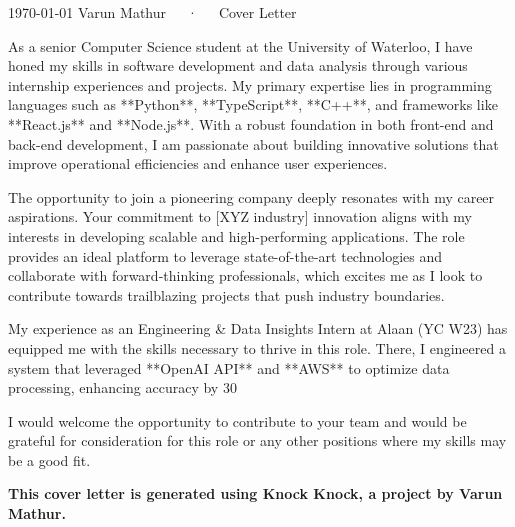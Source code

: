 \documentclass[11pt, a4paper]{awesome-cv}
\begin{document}
\makecvheader[C]

\makecvfooter
{\today}
{Varun Mathur~~~·~~~Cover Letter}
{}

\makelettertitle

\begin{cvletter}

As a senior Computer Science student at the University of Waterloo, I have honed my skills in software development and data analysis through various internship experiences and projects. My primary expertise lies in programming languages such as **Python**, **TypeScript**, **C++**, and frameworks like **React.js** and **Node.js**. With a robust foundation in both front-end and back-end development, I am passionate about building innovative solutions that improve operational efficiencies and enhance user experiences.

The opportunity to join a pioneering company deeply resonates with my career aspirations. Your commitment to [XYZ industry] innovation aligns with my interests in developing scalable and high-performing applications. The role provides an ideal platform to leverage state-of-the-art technologies and collaborate with forward-thinking professionals, which excites me as I look to contribute towards trailblazing projects that push industry boundaries.

My experience as an Engineering & Data Insights Intern at Alaan (YC W23) has equipped me with the skills necessary to thrive in this role. There, I engineered a system that leveraged **OpenAI API** and **AWS** to optimize data processing, enhancing accuracy by 30%

I would welcome the opportunity to contribute to your team and would be grateful for consideration for this role or any other positions where my skills may be a good fit.

\textbf{This cover letter is generated using Knock Knock, a project by Varun Mathur.}

\end{cvletter}


\makeletterclosing
\end{document}
